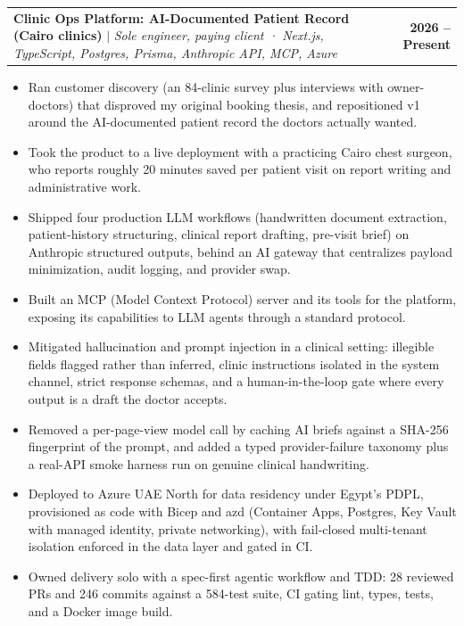 \documentclass[letterpaper,11pt]{article}
\makeatletter
\newcommand{\resumeItem}[1]{
  \item\small{{#1 \vspace{-2pt}}}
}
\newcommand{\resumeProjectHeading}[2]{
    \item
    \begin{tabular*}{1.001\textwidth}{@{}>{\raggedright\arraybackslash}p{0.80\textwidth}@{\extracolsep{\fill}}r@{}}
      \small#1 & \textbf{\small #2}\\
    \end{tabular*}\vspace{-7pt}
}
\newcommand{\resumeItemListStart}{\begin{itemize}}
\newcommand{\resumeItemListEnd}{\end{itemize}\vspace{-5pt}}
\makeatother
\begin{document}
      \resumeProjectHeading
        {\textbf{Clinic Ops Platform: AI-Documented Patient Record (Cairo clinics)} $|$ \emph{Sole engineer, paying client · Next.js, TypeScript, Postgres, Prisma, Anthropic API, MCP, Azure}}{2026 -- Present}
        \resumeItemListStart
          \resumeItem{Ran customer discovery (an 84-clinic survey plus interviews with owner-doctors) that disproved my original booking thesis, and repositioned v1 around the AI-documented patient record the doctors actually wanted.}
          \resumeItem{Took the product to a live deployment with a practicing Cairo chest surgeon, who reports roughly 20 minutes saved per patient visit on report writing and administrative work.}
          \resumeItem{Shipped four production LLM workflows (handwritten document extraction, patient-history structuring, clinical report drafting, pre-visit brief) on Anthropic structured outputs, behind an AI gateway that centralizes payload minimization, audit logging, and provider swap.}
          \resumeItem{Built an MCP (Model Context Protocol) server and its tools for the platform, exposing its capabilities to LLM agents through a standard protocol.}
          \resumeItem{Mitigated hallucination and prompt injection in a clinical setting: illegible fields flagged rather than inferred, clinic instructions isolated in the system channel, strict response schemas, and a human-in-the-loop gate where every output is a draft the doctor accepts.}
          \resumeItem{Removed a per-page-view model call by caching AI briefs against a SHA-256 fingerprint of the prompt, and added a typed provider-failure taxonomy plus a real-API smoke harness run on genuine clinical handwriting.}
          \resumeItem{Deployed to Azure UAE North for data residency under Egypt's PDPL, provisioned as code with Bicep and azd (Container Apps, Postgres, Key Vault with managed identity, private networking), with fail-closed multi-tenant isolation enforced in the data layer and gated in CI.}
          \resumeItem{Owned delivery solo with a spec-first agentic workflow and TDD: 28 reviewed PRs and 246 commits against a 584-test suite, CI gating lint, types, tests, and a Docker image build.}
        \resumeItemListEnd
        \vspace{-13pt}
\end{document}
